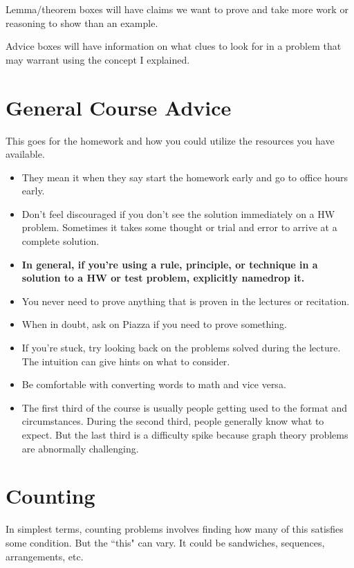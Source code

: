 \documentclass[11pt]{scrartcl}
\begin{document}
\begin{lemma}
    Lemma/theorem boxes will have claims we want to prove and take more work or reasoning to show than an example.
\end{lemma}

\begin{advice}
    Advice boxes will have information on what clues to look for in a problem that may warrant using the concept I explained.
\end{advice}

\section{General Course Advice}
This goes for the homework and how you could utilize the resources you have available.
\begin{itemize}
    \item They mean it when they say start the homework early and go to office hours early.
    \item Don't feel discouraged if you don't see the solution immediately on a HW problem. Sometimes it takes some thought or trial and error to arrive at a complete solution.
    \item \textbf{In general, if you're using a rule, principle, or technique in a solution to a HW or test problem, explicitly namedrop it.}
    \item You never need to prove anything that is proven in the lectures or recitation.
    \item When in doubt, ask on Piazza if you need to prove something.
    \item If you're stuck, try looking back on the problems solved during the lecture. The intuition can give hints on what to consider.
    \item Be comfortable with converting words to math and vice versa.
    \item The first third of the course is usually people getting used to the format and circumstances. During the second third, people generally know what to expect. But the last third is a difficulty spike because graph theory problems are abnormally challenging.
\end{itemize}

\section{Counting}

In simplest terms, counting problems involves finding how many of this satisfies some condition. But the ``this" can vary. It could be sandwiches, sequences, arrangements, etc.
\end{document}
